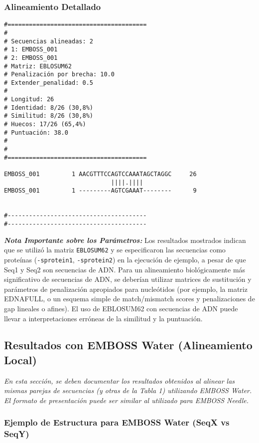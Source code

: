 \documentclass[fleqn,10pt]{article}
\begin{document}
\subsubsection*{Alineamiento Detallado}
\begin{lstlisting}[style=outputstyle, caption={Alineamiento global de Seq1 vs Seq2 por EMBOSS Needle}, basicstyle=\ttfamily\footnotesize]
#=======================================
#
# Secuencias alineadas: 2
# 1: EMBOSS_001
# 2: EMBOSS_001
# Matriz: EBLOSUM62
# Penalización por brecha: 10.0
# Extender_penalidad: 0.5
#
# Longitud: 26
# Identidad: 8/26 (30,8%)
# Similitud: 8/26 (30,8%)
# Huecos: 17/26 (65,4%)
# Puntuación: 38.0
#
#
#=======================================

EMBOSS_001         1 AACGTTTCCAGTCCAAATAGCTAGGC     26
                              ||||.||||        
EMBOSS_001         1 ---------AGTCGAAAT--------      9


#---------------------------------------
#---------------------------------------
\end{lstlisting}

\textit{\textbf{Nota Importante sobre los Parámetros:}} Los resultados mostrados indican que se utilizó la matriz \texttt{EBLOSUM62} y se especificaron las secuencias como proteínas (\texttt{-sprotein1}, \texttt{-sprotein2}) en la ejecución de ejemplo, a pesar de que Seq1 y Seq2 son secuencias de ADN. Para un alineamiento biológicamente más significativo de secuencias de ADN, se deberían utilizar matrices de sustitución y parámetros de penalización apropiados para nucleótidos (por ejemplo, la matriz EDNAFULL, o un esquema simple de match/mismatch scores y penalizaciones de gap lineales o afines). El uso de EBLOSUM62 con secuencias de ADN puede llevar a interpretaciones erróneas de la similitud y la puntuación.

\subsection*{Resultados con EMBOSS Water (Alineamiento Local)}
\textit{En esta sección, se deben documentar los resultados obtenidos al alinear las mismas parejas de secuencias (y otras de la Tabla 1) utilizando EMBOSS Water. El formato de presentación puede ser similar al utilizado para EMBOSS Needle.}

\subsubsection*{Ejemplo de Estructura para EMBOSS Water (SeqX vs SeqY)}
\end{document}

